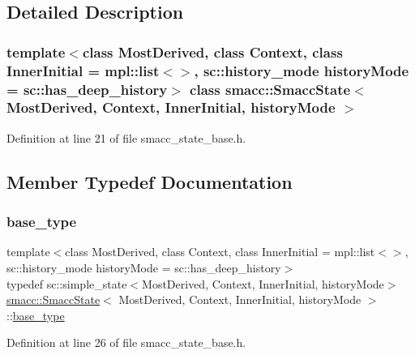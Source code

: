\subsection{Detailed Description}
\subsubsection*{template$<$class Most\+Derived, class Context, class Inner\+Initial = mpl\+::list$<$$>$, sc\+::history\+\_\+mode history\+Mode = sc\+::has\+\_\+deep\+\_\+history$>$\newline
class smacc\+::\+Smacc\+State$<$ Most\+Derived, Context, Inner\+Initial, history\+Mode $>$}



Definition at line 21 of file smacc\+\_\+state\+\_\+base.\+h.



\subsection{Member Typedef Documentation}
\mbox{\label{classsmacc_1_1SmaccState_a68f547c6fe147554bbe607b6fcd8e40a}} 
\subsubsection{\texorpdfstring{base\+\_\+type}{base\_type}}
{\footnotesize\ttfamily template$<$class Most\+Derived, class Context, class Inner\+Initial = mpl\+::list$<$$>$, sc\+::history\+\_\+mode history\+Mode = sc\+::has\+\_\+deep\+\_\+history$>$ \\
typedef sc\+::simple\+\_\+state$<$Most\+Derived, Context, Inner\+Initial, history\+Mode$>$ \hyperlink{classsmacc_1_1SmaccState}{smacc\+::\+Smacc\+State}$<$ Most\+Derived, Context, Inner\+Initial, history\+Mode $>$\+::\hyperlink{classsmacc_1_1SmaccState_a68f547c6fe147554bbe607b6fcd8e40a}{base\+\_\+type}\hspace{0.3cm}{\ttfamily [private]}}



Definition at line 26 of file smacc\+\_\+state\+\_\+base.\+h.

\mbox{\label{classsmacc_1_1SmaccState_a0e15b77514301039f6bc093a9d3f6425}} 
